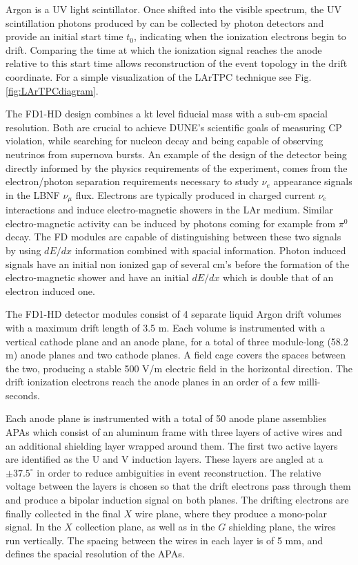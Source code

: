 Argon is a UV light scintillator. Once shifted into the visible spectrum, the UV scintillation photons produced by can be collected by photon detectors and provide an initial start time $t_0$, indicating when the ionization electrons begin to drift. Comparing the time at which the ionization signal reaches the anode relative to this start time allows reconstruction of the event topology in the drift coordinate. For a simple visualization of the LArTPC technique see Fig. \ref{fig:LArTPCdiagram}.

The FD1-HD design combines a kt level fiducial mass with a sub-cm spacial resolution. Both are crucial to achieve DUNE's scientific goals of measuring CP violation, while searching for nucleon decay and being capable of observing neutrinos from supernova bursts. An example of the design of the detector being directly informed by the physics requirements of the experiment, comes from the electron/photon separation requirements necessary to study $\nu_e$ appearance signals in the LBNF $\nu_\mu$ flux. Electrons are typically produced in charged current $\nu_e$ interactions and induce electro-magnetic showers in the LAr medium. Similar electro-magnetic activity can be induced by photons coming for example from $\pi^0$ decay. The FD modules are capable of distinguishing between these two signals by using $dE/dx$ information combined with spacial information. Photon induced signals have an initial non ionized gap of several cm's before the formation of the electro-magnetic shower and have an initial $dE/dx$ which is double that of an electron induced one.

The FD1-HD detector modules consist of 4 separate liquid Argon drift volumes with a maximum drift length of 3.5 m. Each volume is instrumented with a vertical cathode plane and an anode plane, for a total of three module-long (58.2 m) anode planes and two cathode planes. A field cage covers the spaces between the two, producing a stable 500 V/m electric field in the horizontal direction. The drift ionization electrons reach the anode planes in an order of a few milli-seconds. 

Each anode plane is instrumented with a total of 50 anode plane assemblies APAs which consist of an aluminum frame with three layers of active wires and an additional shielding layer wrapped around them. The first two active layers are identified as the U and V induction layers. These layers are angled at a $\pm 37.5^\circ$ in order to reduce ambiguities in event reconstruction. The relative voltage between the layers is chosen so that the drift electrons pass through them and produce a bipolar induction signal on both planes. The drifting electrons are finally collected in the final $X$ wire plane, where they produce a mono-polar signal. In the $X$ collection plane, as well as in the $G$ shielding plane, the wires run vertically. The spacing between the wires in each layer is of 5 mm, and defines the spacial resolution of the APAs.

